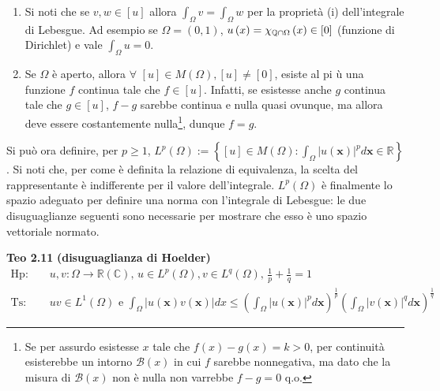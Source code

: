 \documentclass{article}
\begin{document}
\begin{enumerate}
\item Si noti che se $v,w\in \left[ u\right] $ allora $\int_{\Omega
}v=\int_{\Omega }w$ per la propriet\`{a} (i) dell'integrale di Lebesgue. Ad
esempio se $\Omega =\left( 0,1\right) $, $u\left( x\right) =\chi _{%
\mathbb{Q}
\cap \Omega }\left( x\right) \in \left[ 0\right] $ (funzione di Dirichlet) e
vale $\int_{\Omega }u=0$.

\item Se $\Omega $ \`{e} aperto, allora $\forall $ $\left[ u\right] \in
M\left( \Omega \right) ,\left[ u\right] \neq \left[ 0\right] $, esiste al pi%
\`{u} una funzione $f$ continua tale che $f\in \left[ u\right] $. Infatti,
se esistesse anche $g$ continua tale che $g\in \left[ u\right] $, $f-g$
sarebbe continua e nulla quasi ovunque, ma allora deve essere costantemente
nulla\footnote{%
Se per assurdo esistesse $x$ tale che $f\left( x\right) -g\left( x\right)
=k>0$, per continuit\`{a} esisterebbe un intorno $\mathcal{B}\left( x\right) 
$ in cui $f$ sarebbe nonnegativa, ma dato che la misura di $\mathcal{B}%
\left( x\right) $ non \`{e} nulla non varrebbe $f-g=0$ q.o.}, dunque $f=g$.
\end{enumerate}

Si pu\`{o} ora definire, per $p\geq 1$, $L^{p}\left( \Omega \right)
:=\left\{ \left[ u\right] \in M\left( \Omega \right) :\int_{\Omega
}\left\vert u\left( \mathbf{x}\right) \right\vert ^{p}d\mathbf{x\in 
\mathbb{R}
}\right\} $. Si noti che, per come \`{e} definita la relazione di
equivalenza, la scelta del rappresentante \`{e} indifferente per il valore
dell'integrale. $L^{p}\left( \Omega \right) $ \`{e} finalmente lo spazio
adeguato per definire una norma con l'integrale di Lebesgue: le due
disuguaglianze seguenti sono necessarie per mostrare che esso \`{e} uno
spazio vettoriale normato.

\textbf{Teo 2.11} \textbf{(disuguaglianza di Hoelder)}%
\begin{eqnarray*}
\text{Hp}\text{: } &&u,v:\Omega \rightarrow 
\mathbb{R}
\left( 
\mathbb{C}
\right) \text{, }u\in L^{p}\left( \Omega \right) ,v\in L^{q}\left( \Omega
\right) \text{, }\frac{1}{p}+\frac{1}{q}=1 \\
\text{Ts}\text{: } &&uv\in L^{1}\left( \Omega \right) \text{ e }\int_{\Omega
}\left\vert u\left( \mathbf{x}\right) v\left( \mathbf{x}\right) \right\vert
dx\leq \left( \int_{\Omega }\left\vert u\left( \mathbf{x}\right) \right\vert
^{p}d\mathbf{x}\right) ^{\frac{1}{p}}\left( \int_{\Omega }\left\vert v\left( 
\mathbf{x}\right) \right\vert ^{q}d\mathbf{x}\right) ^{\frac{1}{q}}
\end{eqnarray*}
\end{document}
